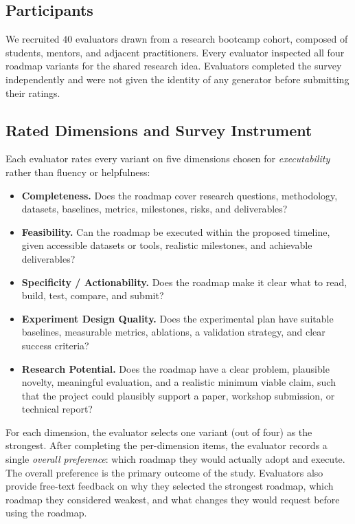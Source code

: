 \documentclass{article}
\begin{document}
\subsection{Participants}
\label{sec:eval:participants}

We recruited $40$ evaluators drawn from a research bootcamp cohort,
composed of students, mentors, and adjacent practitioners. Every
evaluator inspected all four roadmap variants for the shared research
idea. Evaluators completed the survey independently and were not given
the identity of any generator before submitting their ratings.

\subsection{Rated Dimensions and Survey Instrument}
\label{sec:eval:dimensions}

Each evaluator rates every variant on five dimensions chosen for
\emph{executability} rather than fluency or helpfulness:

\begin{itemize}
    \item \textbf{Completeness.} Does the roadmap cover research
    questions, methodology, datasets, baselines, metrics, milestones,
    risks, and deliverables?
    \item \textbf{Feasibility.} Can the roadmap be executed within the
    proposed timeline, given accessible datasets or tools, realistic
    milestones, and achievable deliverables?
    \item \textbf{Specificity / Actionability.} Does the roadmap make
    it clear what to read, build, test, compare, and submit?
    \item \textbf{Experiment Design Quality.} Does the experimental
    plan have suitable baselines, measurable metrics, ablations, a
    validation strategy, and clear success criteria?
    \item \textbf{Research Potential.} Does the roadmap have a clear
    problem, plausible novelty, meaningful evaluation, and a realistic
    minimum viable claim, such that the project could plausibly support
    a paper, workshop submission, or technical report?
\end{itemize}

For each dimension, the evaluator selects one variant (out of four) as
the strongest. After completing the per-dimension items, the evaluator
records a single \emph{overall preference}: which roadmap they would
actually adopt and execute. The overall preference is the primary
outcome of the study. Evaluators also provide free-text feedback on why
they selected the strongest roadmap, which roadmap they considered
weakest, and what changes they would request before using the roadmap.
\end{document}
